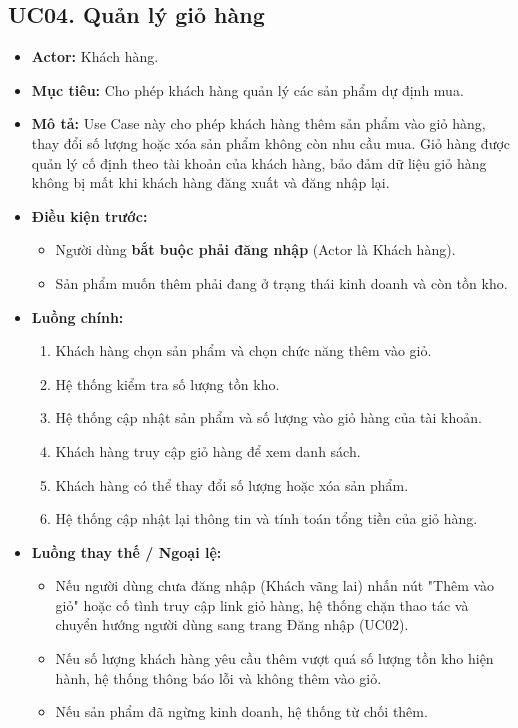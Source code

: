 \documentclass[12pt,a4paper]{article}
\begin{document}

\subsection{UC04. Quản lý giỏ hàng}

\begin{itemize}

 \item \textbf{Actor:} Khách hàng.

 \item \textbf{Mục tiêu:} Cho phép khách hàng quản lý các sản phẩm dự định mua.

 \item \textbf{Mô tả:} Use Case này cho phép khách hàng thêm sản phẩm vào giỏ hàng, thay đổi số lượng hoặc xóa sản phẩm không còn nhu cầu mua. Giỏ hàng được quản lý cố định theo tài khoản của khách hàng, bảo đảm dữ liệu giỏ hàng không bị mất khi khách hàng đăng xuất và đăng nhập lại.

 \item \textbf{Điều kiện trước:}
    \begin{itemize}
        \item Người dùng \textbf{bắt buộc phải đăng nhập} (Actor là Khách hàng).
        \item Sản phẩm muốn thêm phải đang ở trạng thái kinh doanh và còn tồn kho.
    \end{itemize}

 \item \textbf{Luồng chính:}

 \begin{enumerate}
  \item Khách hàng chọn sản phẩm và chọn chức năng thêm vào giỏ.
  \item Hệ thống kiểm tra số lượng tồn kho.
  \item Hệ thống cập nhật sản phẩm và số lượng vào giỏ hàng của tài khoản.
  \item Khách hàng truy cập giỏ hàng để xem danh sách.
  \item Khách hàng có thể thay đổi số lượng hoặc xóa sản phẩm.
  \item Hệ thống cập nhật lại thông tin và tính toán tổng tiền của giỏ hàng.
 \end{enumerate}

 \item \textbf{Luồng thay thế / Ngoại lệ:}
    \begin{itemize}
        \item Nếu người dùng chưa đăng nhập (Khách vãng lai) nhấn nút "Thêm vào giỏ" hoặc cố tình truy cập link giỏ hàng, hệ thống chặn thao tác và chuyển hướng người dùng sang trang Đăng nhập (UC02).
        \item Nếu số lượng khách hàng yêu cầu thêm vượt quá số lượng tồn kho hiện hành, hệ thống thông báo lỗi và không thêm vào giỏ.
        \item Nếu sản phẩm đã ngừng kinh doanh, hệ thống từ chối thêm.
    \end{itemize}


\end{itemize}
\end{document}
